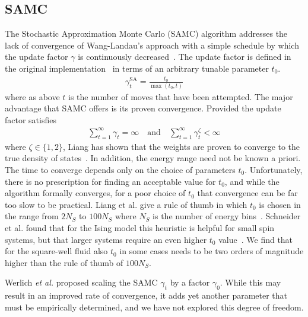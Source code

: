 \documentclass[letterpaper,twocolumn,amsmath,amssymb,pre,aps,10pt]{revtex4-1}
\begin{document}
\subsection{SAMC}
The Stochastic Approximation Monte Carlo (SAMC) algorithm addresses
the lack of convergence of Wang-Landau's approach with a simple
schedule by which the update factor $\gamma$ is continuously
decreased~\cite{liang2007stochastic, werlich2015stochastic,
  schneider2017convergence}.  The update factor is defined in the
original implementation~\cite{liang2007stochastic} in terms of an
arbitrary tunable parameter $t_0$.
\begin{align}
\gamma_{t}^{\text{SA}} =\frac{t_0}{\max(t_0,t)}
\end{align}
where as above $t$ is the number of moves that have been attempted.
The major advantage that SAMC offers is its proven convergence.
Provided the update factor satisfies
\begin{align}
\sum_{t=1}^\infty \gamma_{t} = \infty \quad\textrm{and}\quad
\sum_{t=1}^\infty \gamma_{t}^\zeta < \infty
\end{align}
where $\zeta \in \{1,2\}$, Liang has shown that the weights are proven
to converge to the true density of states~\cite{liang2006theory,
  liang2007stochastic}.  In addition, the energy range need not be
known a priori.  The time to converge depends only on the choice of
parameters $t_0$.  Unfortunately, there is no
prescription for finding an acceptable value for $t_0$, and
while the algorithm formally converges, for a poor choice of $t_0$
that convergence can be far too slow to be practical.
Liang et al. give a rule of thumb in which $t_0$
is chosen in the range from $2N_S$ to $100N_S$ where $N_S$ is the number
of energy bins~\cite{liang2007stochastic}.  Schneider et al. found
that for the
Ising model this heuristic is helpful for small spin
systems, but that larger systems require an even higher $t_0$
value~\cite{schneider2017convergence}.  We find that for the square-well
fluid also $t_0$ in some cases needs to be two orders of magnitude higher
than the rule of thumb of $100N_S$.

Werlich \emph{et al.} proposed scaling the SAMC $\gamma_t$ by a factor
$\gamma_0$.  While this may result in an improved rate of convergence,
it adds yet another parameter that must be empirically determined, and
we have not explored this degree of freedom.

\end{document}
